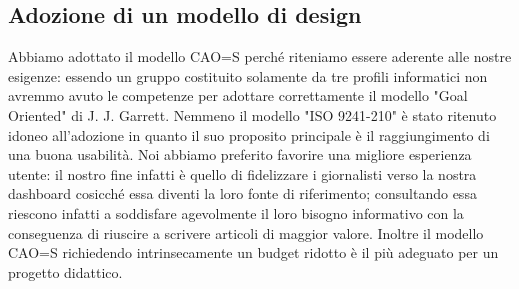 \subsection{Adozione di un modello di design}

Abbiamo adottato il modello CAO=S perché riteniamo essere aderente alle nostre esigenze: essendo un gruppo costituito solamente da tre profili informatici non avremmo avuto le competenze per adottare correttamente il modello "Goal Oriented" di J. J. Garrett. Nemmeno il modello "ISO 9241-210" è stato ritenuto idoneo all'adozione in quanto il suo proposito principale è il raggiungimento di una buona usabilità. Noi abbiamo preferito favorire una migliore esperienza utente: il nostro fine infatti è quello di fidelizzare i giornalisti verso la nostra dashboard cosicché essa diventi la loro fonte di riferimento; consultando essa riescono infatti a soddisfare agevolmente il loro bisogno informativo con la conseguenza di riuscire a scrivere articoli di maggior valore.
Inoltre il modello CAO=S richiedendo intrinsecamente un budget ridotto è il più adeguato per un progetto didattico. 